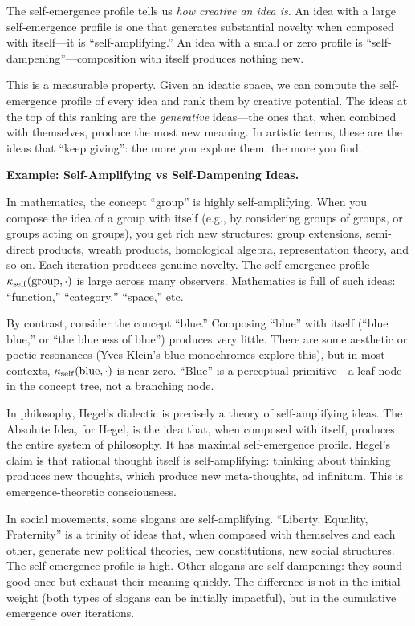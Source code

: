 \begin{interpretation}
The self-emergence profile tells us \emph{how creative an idea is}. An idea with
a large self-emergence profile is one that generates substantial novelty when
composed with itself---it is ``self-amplifying.'' An idea with a small or zero
profile is ``self-dampening''---composition with itself produces nothing new.

This is a measurable property. Given an ideatic space, we can compute the
self-emergence profile of every idea and rank them by creative potential.
The ideas at the top of this ranking are the \emph{generative} ideas---the
ones that, when combined with themselves, produce the most new meaning.
In artistic terms, these are the ideas that ``keep giving'': the more you
explore them, the more you find.

\textbf{Example: Self-Amplifying vs Self-Dampening Ideas.}

In mathematics, the concept ``group'' is highly self-amplifying. When you compose
the idea of a group with itself (e.g., by considering groups of groups, or
groups acting on groups), you get rich new structures: group extensions, semi-
direct products, wreath products, homological algebra, representation theory,
and so on. Each iteration produces genuine novelty. The self-emergence profile
$\kappa_{\mathrm{self}}(\text{group}, \cdot)$ is large across many observers.
Mathematics is full of such ideas: ``function,'' ``category,'' ``space,'' etc.

By contrast, consider the concept ``blue.'' Composing ``blue'' with itself
(``blue blue,'' or ``the blueness of blue'') produces very little. There are
some aesthetic or poetic resonances (Yves Klein's blue monochromes explore this),
but in most contexts, $\kappa_{\mathrm{self}}(\text{blue}, \cdot)$ is near
zero. ``Blue'' is a perceptual primitive---a leaf node in the concept tree,
not a branching node.

In philosophy, Hegel's dialectic is precisely a theory of self-amplifying ideas.
The Absolute Idea, for Hegel, is the idea that, when composed with itself,
produces the entire system of philosophy. It has maximal self-emergence profile.
Hegel's claim is that rational thought itself is self-amplifying: thinking about
thinking produces new thoughts, which produce new meta-thoughts, ad infinitum.
This is emergence-theoretic consciousness.

In social movements, some slogans are self-amplifying. ``Liberty, Equality,
Fraternity'' is a trinity of ideas that, when composed with themselves and each
other, generate new political theories, new constitutions, new social structures.
The self-emergence profile is high. Other slogans are self-dampening: they
sound good once but exhaust their meaning quickly. The difference is not in
the initial weight (both types of slogans can be initially impactful), but in
the cumulative emergence over iterations.


\end{interpretation}
